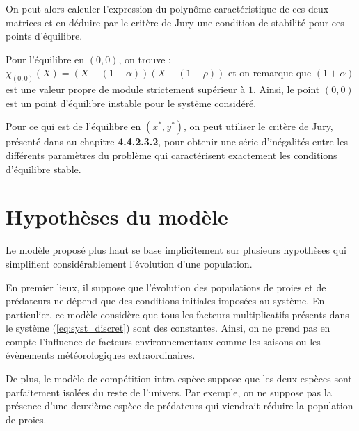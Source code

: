 On peut alors calculer l'expression du polynôme caractéristique de ces deux matrices et en déduire par le critère de Jury une condition de stabilité pour ces points d'équilibre.

Pour l'équilibre en $(0,0)$, on trouve : $\chi_{(0,0)} (X) = (X - (1 + \alpha))(X - (1 - \rho))$ et on remarque que $(1 + \alpha)$ est une valeur propre de module strictement supérieur à $1$. Ainsi, le point $(0, 0)$ est un point d'équilibre instable pour le système considéré.

Pour ce qui est de l'équilibre en $(x^*, y^*)$, on peut utiliser le critère de Jury, présenté dans \cite{Chevet22fr} au chapitre \textbf{4.4.2.3.2}, pour obtenir une série d'inégalités entre les différents paramètres du problème qui caractérisent exactement les conditions d'équilibre stable.

\section{Hypothèses du modèle}
\label{sec:Hypotheses}

Le modèle proposé plus haut se base implicitement sur plusieurs hypothèses qui simplifient considérablement l'évolution d'une population.

En premier lieux, il suppose que l'évolution des populations de proies et de prédateurs ne dépend que des conditions initiales imposées au système. En particulier, ce modèle considère que tous les facteurs multiplicatifs présents dans le système (\ref{eq:syst_discret}) sont des constantes. Ainsi, on ne prend pas en compte l'influence de facteurs environnementaux comme les saisons ou les évènements météorologiques extraordinaires.

De plus, le modèle de compétition intra-espèce suppose que les deux espèces sont parfaitement isolées du reste de l'univers. Par exemple, on ne suppose pas la présence d'une deuxième espèce de prédateurs qui viendrait réduire la population de proies.
